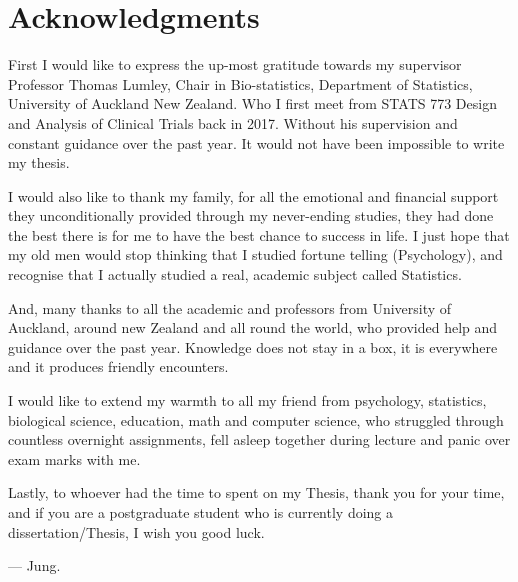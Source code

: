 \chapter*{Acknowledgments}
	
	First I would like to express the up-most gratitude towards my supervisor Professor Thomas Lumley, Chair in Bio-statistics, Department of Statistics, University of Auckland New Zealand. Who I first meet from STATS 773 Design and Analysis of Clinical Trials back in 2017. Without his supervision and constant guidance over the past year. It would not have been impossible to write my thesis. 
	
	\newpara 
	
	I would also like to thank my family, for all the emotional and financial support they unconditionally provided through my never-ending studies, they had done the best there is for me to have the best chance to success in life. I just hope that my old men would stop thinking that I studied fortune telling (Psychology), and recognise that I actually studied a real, academic subject called Statistics. 

	\newpara
	
	And, many thanks to all the academic and professors from University of Auckland, around new Zealand and all round the world, who provided help and guidance over the past year. Knowledge does not stay in a box, it is everywhere and it produces friendly encounters. 
	
	\newpara 
	
	I would like to extend my warmth to all my friend from psychology, statistics, biological science, education, math and computer science, who struggled through countless overnight assignments, fell asleep together during lecture and panic over exam marks with me.  
	
	\newpara
	
	Lastly, to whoever had the time to spent on my Thesis, thank you for your time, and if you are a postgraduate student who is currently doing a dissertation/Thesis, I wish you good luck.  
	
	\newpara
	
	--- Jung. 
		
		
		
		
		
		
		
